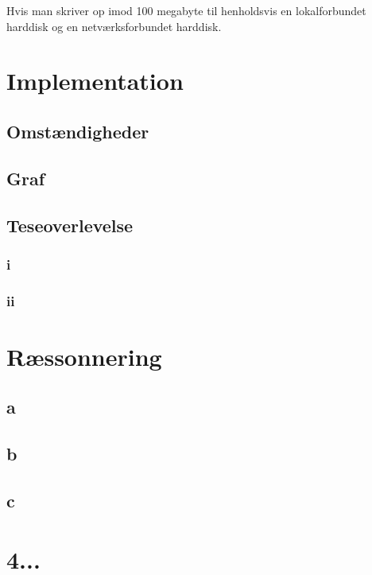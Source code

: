 \documentclass{article}
\begin{document}
Hvis man skriver op imod 100 megabyte til henholdsvis en lokalforbundet harddisk og en netværksforbundet harddisk.

\section{Implementation}

\subsection{Omstændigheder}

\subsection{Graf}

\subsection{Teseoverlevelse}

\subsubsection{i}

\subsubsection{ii}

\section{Ræssonnering}

\subsection{a}
\subsection{b}
\subsection{c}

\section{4...}
\end{document}
